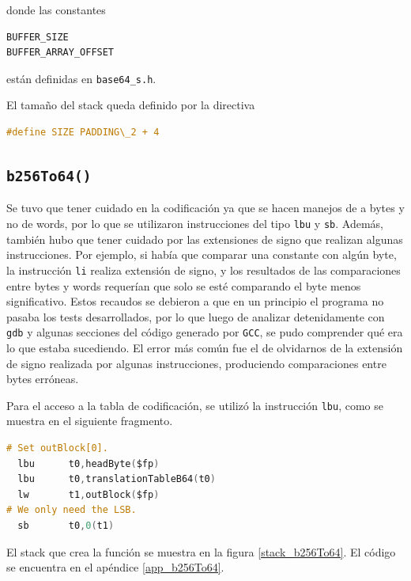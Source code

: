 donde las constantes 
\begin{lstlisting}[language=C, style=StyleC]
BUFFER_SIZE
BUFFER_ARRAY_OFFSET
\end{lstlisting}
están definidas en \texttt{base64\_s.h}.

El tamaño del stack queda definido por la directiva
\begin{lstlisting}[language=C, style=StyleC]
#define SIZE PADDING\_2 + 4
\end{lstlisting}

\subsection{\texttt{b256To64()}}

Se tuvo que tener cuidado en la codificación ya que se hacen manejos de a bytes y no de words, por lo que se utilizaron instrucciones del tipo \texttt{lbu} y \texttt{sb}. Además, también hubo que tener cuidado por las extensiones de signo que realizan algunas instrucciones. Por ejemplo, si había que comparar una constante con algún byte, la instrucción \texttt{li} realiza extensión de signo, y los resultados de las comparaciones entre bytes y words requerían que solo se esté comparando el byte menos significativo. Estos recaudos se debieron a que en un principio el programa no pasaba los tests desarrollados, por lo que luego de analizar detenidamente con \texttt{gdb} y algunas secciones del código generado por \texttt{GCC}, se pudo comprender qué era lo que estaba sucediendo. El error más común fue el de olvidarnos de la extensión de signo realizada por algunas instrucciones, produciendo comparaciones entre bytes erróneas.

Para el acceso a la tabla de codificación, se utilizó la instrucción \texttt{lbu}, como se muestra en el siguiente fragmento.
\begin{lstlisting}[language=C, style=StyleC]
# Set outBlock[0].
  lbu	   t0,headByte($fp)
  lbu	   t0,translationTableB64(t0)
  lw	   t1,outBlock($fp)
# We only need the LSB.
  sb	   t0,0(t1)
\end{lstlisting}

El stack que crea la función se muestra en la figura \ref{stack_b256To64}. El código se encuentra en el apéndice \ref{app_b256To64}.
	
